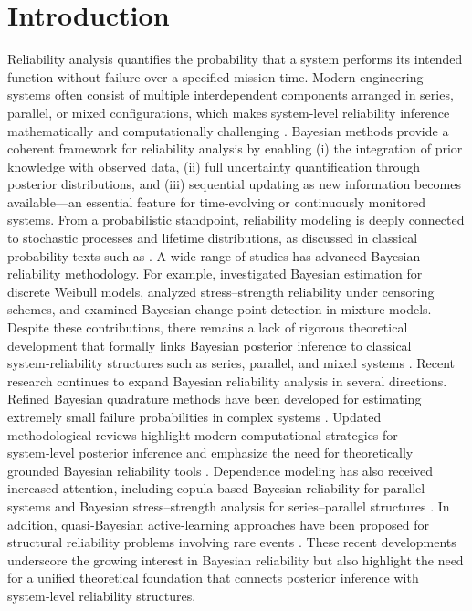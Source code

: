 \documentclass[twoside]{article}
\theoremstyle{plain}
\theoremstyle{definition}
\begin{document}
\section{Introduction}
Reliability analysis quantifies the probability that a system performs its intended function without failure over a specified mission time. Modern engineering systems often consist of multiple interdependent components arranged in series, parallel, or mixed configurations, which makes system‑level reliability inference mathematically and computationally challenging \cite{Barlow:Proschan:1996}.
Bayesian methods provide a coherent framework for reliability analysis by enabling (i) the integration of prior knowledge with observed data, (ii) full uncertainty quantification through posterior distributions, and (iii) sequential updating as new information becomes available—an essential feature for time‑evolving or continuously monitored systems. From a probabilistic standpoint, reliability modeling is deeply connected to stochastic processes and lifetime distributions, as discussed in classical probability texts such as \cite{Ross:2019}.
A wide range of studies has advanced Bayesian reliability methodology. For example, \cite{Ganji:Gharari:2016} investigated Bayesian estimation for discrete Weibull models, \cite{Abravesh:et.al.:2018} analyzed stress–strength reliability under censoring schemes, and \cite{Ganji:Mostafayi:2019} examined Bayesian change‑point detection in mixture models. Despite these contributions, there remains a lack of rigorous theoretical development that formally links Bayesian posterior inference to classical system‑reliability structures such as series, parallel, and mixed systems \cite{Barlow:Proschan:1996,Gelman:2013}.
Recent research continues to expand Bayesian reliability analysis in several directions. Refined Bayesian quadrature methods have been developed for estimating extremely small failure probabilities in complex systems \cite{Refined2024}. Updated methodological reviews highlight modern computational strategies for system‑level posterior inference and emphasize the need for theoretically grounded Bayesian reliability tools \cite{Liu2019}. Dependence modeling has also received increased attention, including copula‑based Bayesian reliability for parallel systems \cite{Lin2021} and Bayesian stress–strength analysis for series–parallel structures \cite{Zhang2025}. In addition, quasi‑Bayesian active‑learning approaches have been proposed for structural reliability problems involving rare events \cite{QuasiBayes2024}. These recent developments underscore the growing interest in Bayesian reliability but also highlight the need for a unified theoretical foundation that connects posterior inference with system‑level reliability structures.
\end{document}
